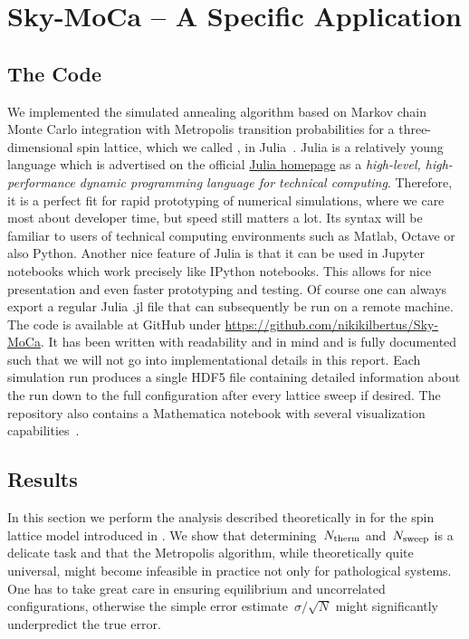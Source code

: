 %
\chapter{Sky-MoCa -- A Specific Application}\label{chap:2}
%
\section{The Code}\label{sec:code}
%
We implemented the simulated annealing algorithm based on Markov chain Monte
Carlo integration with Metropolis transition probabilities for a
three-dimensional spin lattice, which we called , in
Julia~\cite{julia}. Julia is a relatively young language which is advertised on
the official \href{http://julialang.org/}{Julia homepage} as a \emph{high-level,
high-performance dynamic programming language for technical computing}.
Therefore, it is a perfect fit for rapid prototyping of numerical simulations,
where we care most about developer time, but speed still matters a lot. Its
syntax will be familiar to users of technical computing environments such as
Matlab, Octave or also Python. Another nice feature of Julia is that it can be
used in Jupyter notebooks which work precisely like IPython notebooks. This
allows for nice presentation and even faster prototyping and testing. Of course
one can always export a regular Julia \textsf{.jl} file that can subsequently be
run on a remote machine. The code is available at GitHub under
\href{https://github.com/nikikilbertus/Sky-MoCa}{https://github.com/nikikilbertus/Sky-MoCa}.
It has been written with readability and in mind and is fully documented such
that we will not go into implementational details in this report. Each
simulation run produces a single HDF5 file containing detailed information about
the run down to the full configuration after every lattice sweep if desired. The
repository also contains a Mathematica notebook with several visualization
capabilities~\cite{mathematica}.
%
\section{Results}\label{sec:results}
%
In this section we perform the analysis described theoretically in
 for the spin lattice model introduced in
. We show that determining~$N_{\mathrm{therm}}$ and~$N_{\mathrm{sweep}}$ is a
delicate task and that the Metropolis algorithm, while theoretically quite
universal, might become infeasible in practice not only for pathological
systems. One has to take great care in ensuring equilibrium and uncorrelated
configurations, otherwise the simple error estimate~$\sigma/\sqrt{N}$ might
significantly underpredict the true error.

